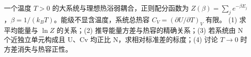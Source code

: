 一个温度 \(T>0\) 的大系统与理想热浴弱耦合，正则配分函数为 \(Z(\beta)=\sum_j e^{-\beta E_j}\)，\(\beta=1/(k_BT)\)。能级不显含温度，系统总热容 \(C_V=(\partial U/\partial T)_V\) 有限。
(1) 求平均能量与 \(\ln Z\) 的关系；(2) 推导能量方差与热容的精确关系；(3) 若系统由 N 个近独立单元构成且 U、Cv 均正比 N，求相对标准差的标度；(4) 讨论 \(T\to 0\) 时方差消失与热容正性。
